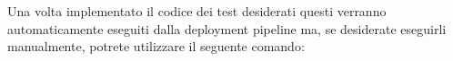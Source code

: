 \begin{center}
	\noindent{}
\end{center}
\noindent
Una volta implementato il codice dei test desiderati questi verranno automaticamente eseguiti dalla deployment pipeline ma, se desiderate eseguirli manualmente, potrete utilizzare il seguente comando:
\begin{center}
	\noindent{}
\end{center}

\newpage

